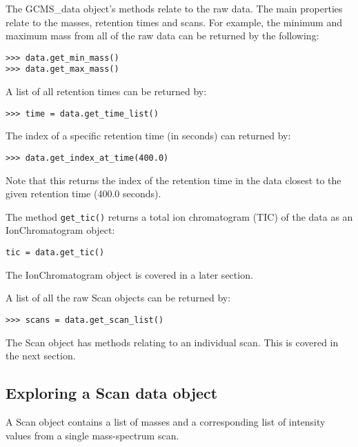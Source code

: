 The GCMS\_data object's methods relate to the raw data. The main properties
relate to the masses, retention times and scans. For example, the
minimum and maximum mass from all of the raw data can be returned by the
following:

\begin{verbatim}
>>> data.get_min_mass()
>>> data.get_max_mass()
\end{verbatim}

A list of all retention times can be returned by:

\begin{verbatim}
>>> time = data.get_time_list()
\end{verbatim}

The index of a specific retention time (in seconds) can returned by:

\begin{verbatim}
>>> data.get_index_at_time(400.0)
\end{verbatim}

\noindent
Note that this returns the index of the retention time in the
data closest to the given retention time (400.0 seconds).

The method {\tt get\_tic()} returns a total ion chromatogram (TIC) of the data
as an IonChromatogram object:

\begin{verbatim}
tic = data.get_tic()
\end{verbatim}

\noindent
The IonChromatogram object is covered in a later section.

A list of all the raw Scan objects can be returned by:

\begin{verbatim}
>>> scans = data.get_scan_list()
\end{verbatim}

\noindent
The Scan object has methods relating to an individual scan. This is covered in
the next section.

\subsection {Exploring a Scan data object}


A Scan object contains a list of masses and a corresponding list of intensity
values from a single mass-spectrum scan.

